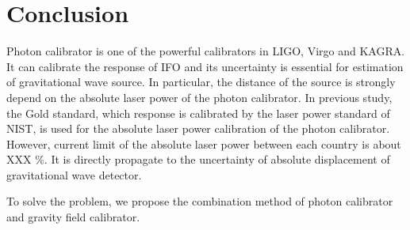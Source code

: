 \documentclass[12pt]{iopart}
\begin{document}
\section{Conclusion}
Photon calibrator is one of the powerful calibrators in LIGO, Virgo and KAGRA. It can calibrate the response of IFO and its uncertainty is essential for estimation of gravitational wave source. In particular, the distance of the source is strongly depend on the absolute laser power of the photon calibrator. In previous study, the Gold standard, which response is calibrated by the laser power standard of NIST, is used for the absolute laser power calibration of the photon calibrator. However, current limit of the absolute laser power between each country is about XXX \%. It is directly propagate to the uncertainty of absolute displacement of gravitational wave detector.

To solve the problem, we propose the combination method of photon calibrator and gravity field calibrator. 

\begin{verbatim}

\end{verbatim}
\end{document}
